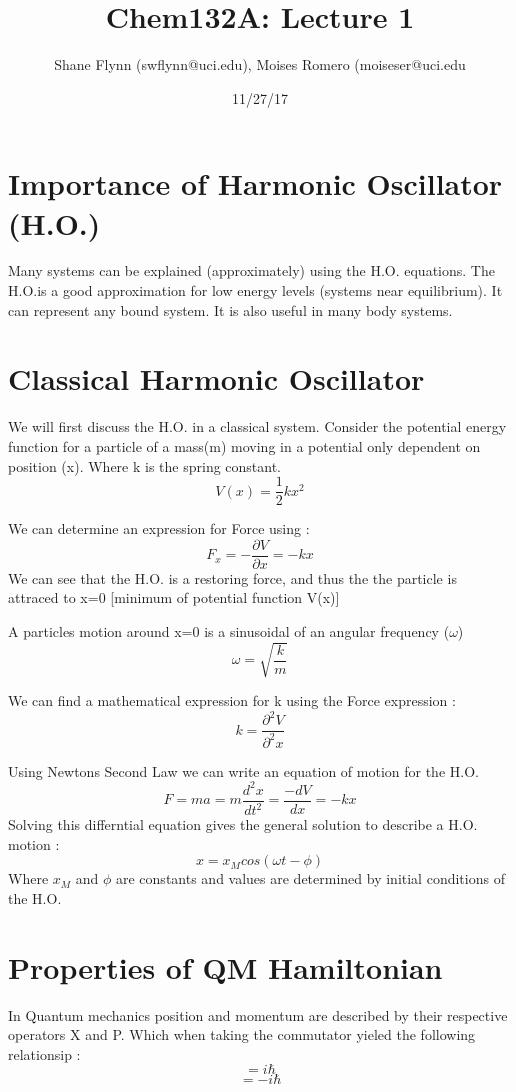 \documentclass{article}
\title{Chem132A: Lecture 1}
\author{Shane Flynn (swflynn@uci.edu), Moises Romero (moiseser@uci.edu}
\date{11/27/17}
\newcommand{\be}{\begin{equation}}
\newcommand{\ee}{\end{equation}}
\begin{document}
\maketitle

\section{Importance of Harmonic Oscillator (H.O.)}
Many systems can be explained (approximately) using the H.O. equations.
The H.O.is a good approximation for low energy levels (systems near equilibrium). 
It can represent any bound system. 
It is also useful in many body systems. 

\section{Classical Harmonic Oscillator}
We will first discuss the H.O. in a classical system. 
Consider the potential energy function for a particle of a mass(m) moving in a potential only dependent on position (x). Where k is the spring constant. 
\be
V(x) = \frac{1}{2}kx^2
\ee

We can determine an expression for Force using : 
\be
F_x=-\frac{\partial V}{\partial x} = -kx
\ee
We can see that the H.O. is a restoring force, and thus the the particle is attraced to x=0 [minimum of potential function V(x)]

A particles motion around x=0 is a sinusoidal of an angular frequency ($\omega$) 
\be
\omega=\sqrt{\frac{k}{m}}
\ee

We can find a mathematical expression for k using the Force expression : 
\be
k=\frac{\partial^2V}{\partial^2x}
\ee

Using Newtons Second Law we can write an equation of motion for the H.O.
\be
F=ma=m\frac{d^2x}{dt^2}=\frac{-dV}{dx}=-kx
\ee
Solving this differntial equation gives the general solution to describe a H.O. motion : 
\be
x=x_Mcos(\omega t - \phi)
\ee
Where $x_M$ and $\phi$ are constants and values are determined by initial conditions of the H.O. 










\section{Properties of QM Hamiltonian}
In Quantum mechanics position and momentum are described by their respective operators X and P. 
Which when taking the commutator yieled the following relationsip : 
\be
[X,P]=i\hbar
\ee
\be
[P,X]=-i\hbar
\ee
\end{document}

